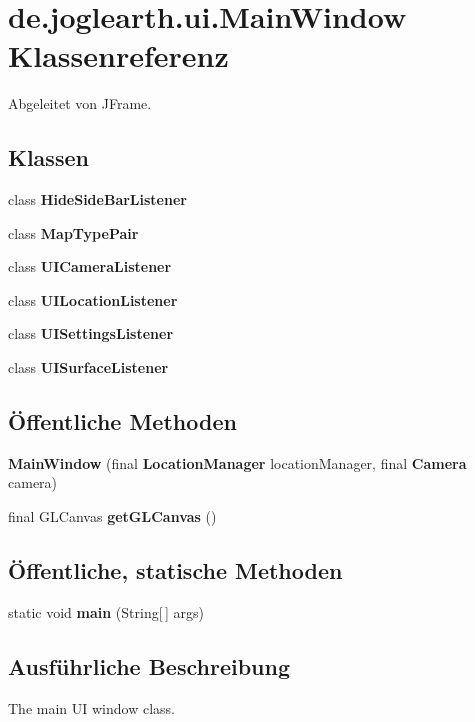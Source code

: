 \section{de.\-joglearth.\-ui.\-Main\-Window Klassenreferenz}
\label{classde_1_1joglearth_1_1ui_1_1_main_window}


Abgeleitet von J\-Frame.

\subsection*{Klassen}
\begin{DoxyCompactItemize}
\item 
class {\bfseries Hide\-Side\-Bar\-Listener}
\item 
class {\bfseries Map\-Type\-Pair}
\item 
class {\bfseries U\-I\-Camera\-Listener}
\item 
class {\bfseries U\-I\-Location\-Listener}
\item 
class {\bfseries U\-I\-Settings\-Listener}
\item 
class {\bfseries U\-I\-Surface\-Listener}
\end{DoxyCompactItemize}
\subsection*{Öffentliche Methoden}
\begin{DoxyCompactItemize}
\item 
{\bf Main\-Window} (final {\bf Location\-Manager} location\-Manager, final {\bf Camera} camera)
\item 
final G\-L\-Canvas {\bf get\-G\-L\-Canvas} ()
\end{DoxyCompactItemize}
\subsection*{Öffentliche, statische Methoden}
\begin{DoxyCompactItemize}
\item 
static void {\bfseries main} (String[$\,$] args)\label{classde_1_1joglearth_1_1ui_1_1_main_window_a6655d08b45d09fdfa1b5229560e79608}

\end{DoxyCompactItemize}


\subsection{Ausführliche Beschreibung}
The main U\-I window class. 


